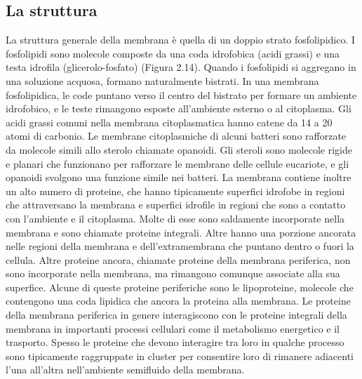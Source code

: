 \subsection{La struttura}
La struttura generale della membrana è quella di un doppio strato fosfolipidico. I fosfolipidi sono molecole composte da una coda idrofobica (acidi grassi) e una testa idrofila (glicerolo-fosfato) (Figura 2.14).
Quando i fosfolipidi si aggregano in una soluzione acquosa, formano naturalmente bistrati. In una membrana 
fosfolipidica, le code puntano verso il centro del bistrato per formare un ambiente idrofobico, e le teste rimangono esposte 
all'ambiente esterno o al citoplasma. Gli acidi grassi comuni nella membrana citoplasmatica hanno catene da  14 a 20 atomi di carbonio.
Le membrane citoplasmiche di alcuni batteri sono rafforzate da molecole simili allo sterolo chiamate opanoidi. Gli steroli sono molecole rigide e planari 
che funzionano per rafforzare le membrane delle cellule eucariote, e gli opanoidi svolgono una funzione simile nei batteri.
La membrana contiene inoltre un alto numero di proteine, che hanno tipicamente superfici idrofobe in regioni che attraversano la membrana e superfici 
idrofile in regioni che sono a contatto con l'ambiente e il citoplasma. Molte di esse sono saldamente incorporate nella membrana e sono chiamate proteine 
integrali. Altre hanno una porzione ancorata nelle regioni della membrana e dell'extramembrana che puntano dentro o fuori la cellula. Altre proteine ancora, 
chiamate proteine della membrana periferica, non sono incorporate nella membrana, ma rimangono comunque associate alla sua superfice. Alcune di queste 
proteine periferiche sono le lipoproteine, molecole che contengono una coda lipidica che ancora la proteina alla membrana. Le proteine della membrana 
periferica in genere interagiscono con le proteine integrali della membrana in importanti processi cellulari come il metabolismo energetico e il trasporto. 
Spesso le proteine che devono interagire tra loro in qualche processo sono tipicamente raggruppate in cluster per consentire loro di rimanere adiacenti 
l'una all'altra nell'ambiente semifluido della  membrana.

